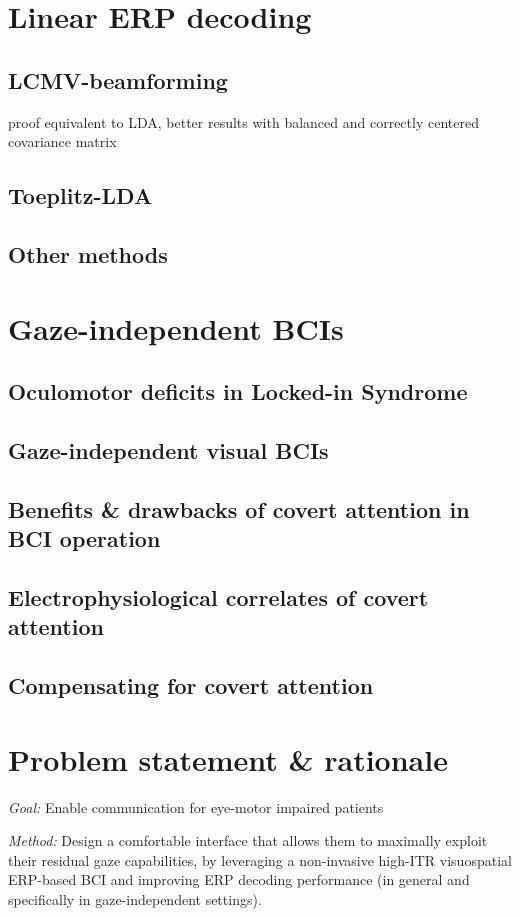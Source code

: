 \chapter{Linear ERP decoding}
\section{LCMV-beamforming}
proof equivalent to LDA, better results with balanced and correctly centered
covariance matrix
\section{Toeplitz-LDA}
\section{Other methods}

\chapter{Gaze-independent BCIs}
\section{Oculomotor deficits in Locked-in Syndrome}
\section{Gaze-independent visual BCIs}
\section{Benefits \& drawbacks of covert attention in BCI operation}
\section{Electrophysiological correlates of covert attention}
\section{Compensating for covert attention}

\chapter{Problem statement \& rationale}
\emph{Goal:} Enable communication for eye-motor impaired patients

\emph{Method:} Design a comfortable interface that allows them to maximally exploit
their residual gaze capabilities, by leveraging a non-invasive high-ITR
visuospatial ERP-based BCI and improving ERP decoding performance (in general
and specifically in gaze-independent settings).

